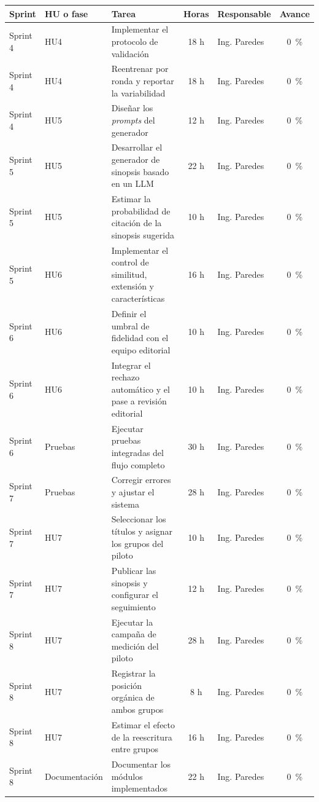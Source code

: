 \documentclass[
11pt, %
codirector, %
]{charter}
\begin{document}
\begin{table}[htpb]
\centering
\begin{tabularx}{\linewidth}{@{}|p{1.55cm}|p{2.62cm}|>{\raggedright\arraybackslash}X|c|l|c|@{}}
\hline
\rowcolor[HTML]{C0C0C0}
Sprint & HU o fase & Tarea & Horas & Responsable & Avance \\ \hline
Sprint 4 & HU4 & Implementar el protocolo de validación & 18 h & Ing. Paredes & 0~\% \\ \hline
Sprint 4 & HU4 & Reentrenar por ronda y reportar la variabilidad & 18 h & Ing. Paredes & 0~\% \\ \hline
Sprint 4 & HU5 & Diseñar los \textit{prompts} del generador & 12 h & Ing. Paredes & 0~\% \\ \hline
Sprint 5 & HU5 & Desarrollar el generador de sinopsis basado en un LLM & 22 h & Ing. Paredes & 0~\% \\ \hline
Sprint 5 & HU5 & Estimar la probabilidad de citación de la sinopsis sugerida & 10 h & Ing. Paredes & 0~\% \\ \hline
Sprint 5 & HU6 & Implementar el control de similitud, extensión y características & 16 h & Ing. Paredes & 0~\% \\ \hline
Sprint 6 & HU6 & Definir el umbral de fidelidad con el equipo editorial & 10 h & Ing. Paredes & 0~\% \\ \hline
Sprint 6 & HU6 & Integrar el rechazo automático y el pase a revisión editorial & 10 h & Ing. Paredes & 0~\% \\ \hline
Sprint 6 & Pruebas & Ejecutar pruebas integradas del flujo completo & 30 h & Ing. Paredes & 0~\% \\ \hline
Sprint 7 & Pruebas & Corregir errores y ajustar el sistema & 28 h & Ing. Paredes & 0~\% \\ \hline
Sprint 7 & HU7 & Seleccionar los títulos y asignar los grupos del piloto & 10 h & Ing. Paredes & 0~\% \\ \hline
Sprint 7 & HU7 & Publicar las sinopsis y configurar el seguimiento & 12 h & Ing. Paredes & 0~\% \\ \hline
Sprint 8 & HU7 & Ejecutar la campaña de medición del piloto & 28 h & Ing. Paredes & 0~\% \\ \hline
Sprint 8 & HU7 & Registrar la posición orgánica de ambos grupos & 8 h & Ing. Paredes & 0~\% \\ \hline
Sprint 8 & HU7 & Estimar el efecto de la reescritura entre grupos & 16 h & Ing. Paredes & 0~\% \\ \hline
Sprint 8 & Documentación & Documentar los módulos implementados & 22 h & Ing. Paredes & 0~\% \\ \hline
\end{tabularx}
\end{table}
\end{document}
